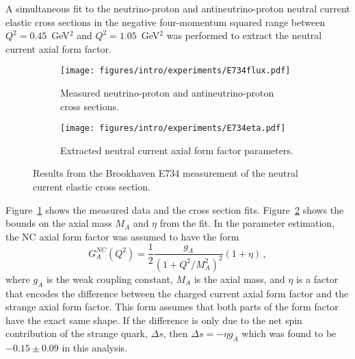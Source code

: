   A simultaneous fit to the neutrino-proton and antineutrino-proton neutral
  current elastic cross sections in the negative four-momentum squared range
  between $Q^2 = 0.45$~GeV$^2$ and $Q^2 = 1.05$~GeV$^2$ was performed to
  extract the neutral current axial form factor.
  \begin{figure}[h]
    \centering
    \begin{subfigure}[t]{2.5in}
      \texttt{[image: figures/intro/experiments/E734flux.pdf]}
      \caption{Measured neutrino-proton and antineutrino-proton cross sections.}
      \label{fig:e734xsec}
    \end{subfigure}
    \hspace{2pt}
    \begin{subfigure}[t]{2.5in}
      \texttt{[image: figures/intro/experiments/E734eta.pdf]}
      \caption{Extracted neutral current axial form factor parameters.}
      \label{fig:e734eta}
    \end{subfigure}
    \caption{Results from the Brookhaven E734 measurement of the neutral
    current elastic cross section.}
    \label{fig:e734results}
  \end{figure}
  Figure~\ref{fig:e734xsec} shows the measured data and the cross section
  fits. Figure~\ref{fig:e734eta} shows the bounds on the axial mass $M_A$ and
  $\eta$ from the fit. In the parameter estimation, the NC axial form factor
  was assumed to have the form
  \begin{equation}\label{eq:axdipole}
    G_A^{NC}(Q^2) = \frac{1}{2}\frac{g_A}{(1+Q^2/M_A^2)^2}(1+\eta) \,,
  \end{equation}
  where $g_A$ is the weak coupling constant, $M_A$ is the axial mass, and
  $\eta$ is a factor that encodes the difference between the charged current
  axial form factor and the strange axial form factor. This form assumes that
  both parts of the form factor have the exact same shape. If the difference
  is only due to the net spin contribution of the strange quark, $\Delta s$,
  then $\Delta s = -\eta g_A$ which was found to be $-0.15 \pm 0.09$ in this
  analysis.

